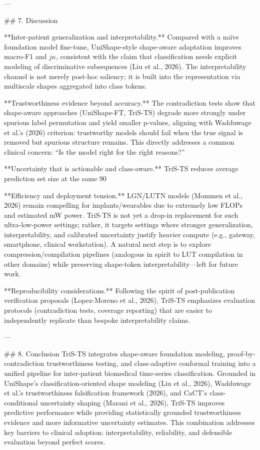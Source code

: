 ---

## 7. Discussion  

**Inter-patient generalization and interpretability.**  
Compared with a naïve foundation model fine-tune, UniShape-style shape-aware adaptation improves macro-F1 and \(j\kappa\), consistent with the claim that classification needs explicit modeling of discriminative subsequences (Liu et al., 2026). The interpretability channel is not merely post-hoc saliency; it is built into the representation via multiscale shapes aggregated into class tokens.

**Trustworthiness evidence beyond accuracy.**  
The contradiction tests show that shape-aware approaches (UniShape-FT, TriS-TS) degrade more strongly under spurious label permutation and yield smaller p-values, aligning with Wadduwage et al.’s (2026) criterion: trustworthy models should fail when the true signal is removed but spurious structure remains. This directly addresses a common clinical concern: “Is the model right for the right reasons?”

**Uncertainty that is actionable and class-aware.**  
TriS-TS reduces average prediction set size at the same 90%

**Efficiency and deployment tension.**  
LGN/LUTN models (Mommen et al., 2026) remain compelling for implants/wearables due to extremely low FLOPs and estimated mW power. TriS-TS is not yet a drop-in replacement for such ultra-low-power settings; rather, it targets settings where stronger generalization, interpretability, and calibrated uncertainty justify heavier compute (e.g., gateway, smartphone, clinical workstation). A natural next step is to explore compression/compilation pipelines (analogous in spirit to LUT compilation in other domains) while preserving shape-token interpretability—left for future work.

**Reproducibility considerations.**  
Following the spirit of post-publication verification proposals (Lopez-Moreno et al., 2026), TriS-TS emphasizes evaluation protocols (contradiction tests, coverage reporting) that are easier to independently replicate than bespoke interpretability claims.

---

## 8. Conclusion  
TriS-TS integrates shape-aware foundation modeling, proof-by-contradiction trustworthiness testing, and class-adaptive conformal training into a unified pipeline for inter-patient biomedical time-series classification. Grounded in UniShape’s classification-oriented shape modeling (Liu et al., 2026), Wadduwage et al.’s trustworthiness falsification framework (2026), and CaCT’s class-conditional uncertainty shaping (Marani et al., 2026), TriS-TS improves predictive performance while providing statistically grounded trustworthiness evidence and more informative uncertainty estimates. This combination addresses key barriers to clinical adoption: interpretability, reliability, and defensible evaluation beyond perfect scores.

